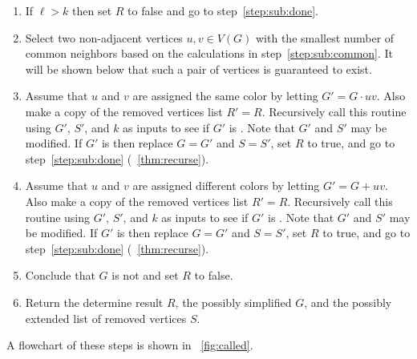 \begin{enumerate}
\item\label{step:sub:lcheck} If \(\ell>k\) then set \(R\) to false and go to step~\ref{step:sub:done}.

\item\label{step:sub:select2} Select two non-adjacent vertices \(u,v\in V(G)\) with the smallest number of common
  neighbors based on the calculations in step~\ref{step:sub:common}.  It will be shown below that such a pair of
  vertices is guaranteed to exist.

\item\label{step:sub:call1} Assume that \(u\) and \(v\) are assigned the same color by letting \(G'=G\cdot uv\).
  Also make a copy of the removed vertices list \(R'=R\).  Recursively call this routine using \(G'\), \(S'\), and
  \(k\) as inputs to see if \(G'\) is .  Note that \(G'\) and \(S'\) may be modified.  If \(G'\) is
   then replace \(G=G'\) and \(S=S'\), set \(R\) to true, and go to step~\ref{step:sub:done}
  (\theoremname~\ref{thm:recurse}).

\item\label{step:sub:call2} Assume that \(u\) and \(v\) are assigned different colors by letting \(G'=G+uv\).  Also
  make a copy of the removed vertices list \(R'=R\).  Recursively call this routine using \(G'\), \(S'\), and \(k\)
  as inputs to see if \(G'\) is .  Note that \(G'\) and \(S'\) may be modified.  If \(G'\) is
   then replace \(G=G'\) and \(S=S'\), set \(R\) to true, and go to step~\ref{step:sub:done}
  (\theoremname~\ref{thm:recurse}).

\item\label{step:sub:fail} Conclude that \(G\) is not  and set \(R\) to false.

\item\label{step:sub:done} Return the determine result \(R\), the possibly simplified \(G\), and the possibly
  extended list of removed vertices \(S\).
\end{enumerate}

A flowchart of these steps is shown in \figurename~\ref{fig:called}.

